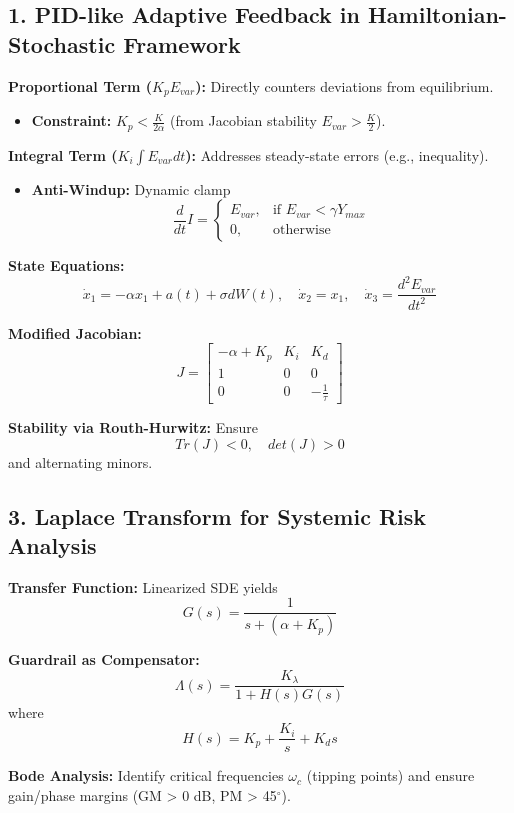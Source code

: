 \documentclass{article}
\theoremstyle{definition}
\begin{document}
\subsection*{1. PID-like Adaptive Feedback in Hamiltonian-Stochastic Framework}
\textbf{Proportional Term (\(K_p E_{var}\)):} Directly counters deviations from equilibrium.  
\begin{itemize}
    \item \textbf{Constraint:} \( K_p < \frac{K}{2\alpha} \) (from Jacobian stability \( E_{var} > \frac{K}{2} \)).
\end{itemize}

\textbf{Integral Term (\( K_i \int E_{var} dt \)):} Addresses steady-state errors (e.g., inequality).  
\begin{itemize}
    \item \textbf{Anti-Windup:} Dynamic clamp  
    \[
    \frac{d}{dt} I =
    \begin{cases} 
      E_{var}, & \text{if } E_{var} < \gamma Y_{max} \\
      0, & \text{otherwise}
    \end{cases}
    \]
\end{itemize}

\textbf{State Equations:}
\[
\dot{x}_1 = -\alpha x_1 + a(t) + \sigma dW(t), \quad
\dot{x}_2 = x_1, \quad
\dot{x}_3 = \frac{d^2E_{var}}{dt^2}
\]

\textbf{Modified Jacobian:}
\[
J =
\begin{bmatrix}
-\alpha + K_p & K_i & K_d \\
1 & 0 & 0 \\
0 & 0 & -\frac{1}{\tau}
\end{bmatrix}
\]

\textbf{Stability via Routh-Hurwitz:} Ensure  
\[
Tr(J) < 0, \quad det(J) > 0
\]
and alternating minors.

\subsection*{3. Laplace Transform for Systemic Risk Analysis}
\textbf{Transfer Function:} Linearized SDE yields  
\[
G(s) = \frac{1}{s + (\alpha + K_p)}
\]

\textbf{Guardrail as Compensator:}  
\[
\Lambda(s) = \frac{K_{\lambda}}{1 + H(s)G(s)}
\]
where  
\[
H(s) = K_p + \frac{K_i}{s} + K_d s
\]

\textbf{Bode Analysis:} Identify critical frequencies $\omega_c$ (tipping points) and ensure gain/phase margins (GM > 0 dB, PM > 45$^\circ$).
\end{document}
